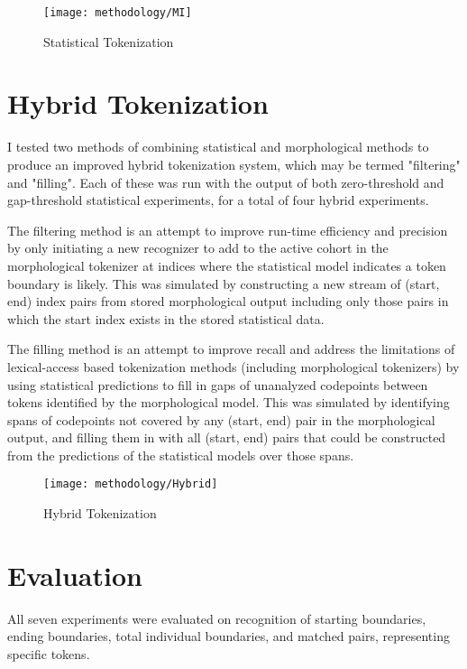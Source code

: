 \begin{figure}[ht!]
	\texttt{[image: methodology/MI]}
	\caption{Statistical Tokenization}
	\label{statdiagram}
\end{figure}

\section{Hybrid Tokenization}
I tested two methods of combining statistical and morphological methods to produce an improved hybrid tokenization system, which may be termed "filtering" and "filling". Each of these was run with the output of both zero-threshold and gap-threshold statistical experiments, for a total of four hybrid experiments.

The filtering method is an attempt to improve run-time efficiency and precision by only initiating a new recognizer to add to the active cohort in the morphological tokenizer at indices where the statistical model indicates a token boundary is likely. This was simulated by constructing a new stream of (start, end) index pairs from stored morphological output including only those pairs in which the start index exists in the stored statistical data.

The filling method is an attempt to improve recall and address the limitations of lexical-access based tokenization methods (including morphological tokenizers) by using statistical predictions to fill in gaps of unanalyzed codepoints between tokens identified by the morphological model. This was simulated by identifying spans of codepoints not covered by any (start, end) pair in the morphological output, and filling them in with all (start, end) pairs that could be constructed from the predictions of the statistical models over those spans.

\begin{figure}[ht!]
	\texttt{[image: methodology/Hybrid]}
	\caption{Hybrid Tokenization}
	\label{hybriddiagram}
\end{figure}

\section{Evaluation}
All seven experiments were evaluated on recognition of starting boundaries, ending boundaries, total individual boundaries, and matched pairs, representing specific tokens.

